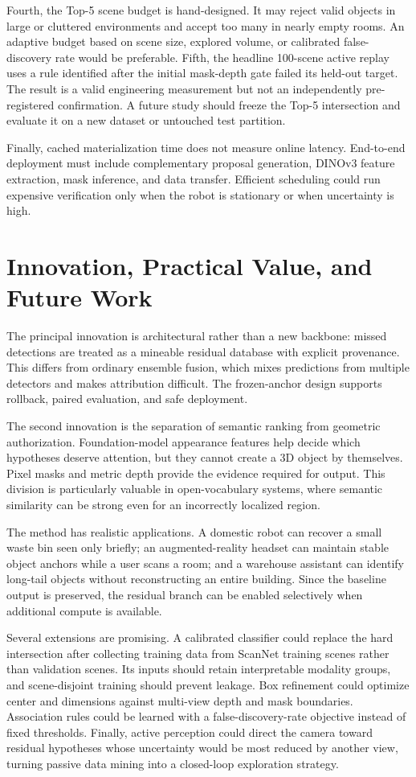 \documentclass[11pt,a4paper]{article}
\begin{document}
Fourth, the Top-5 scene budget is hand-designed. It may reject valid objects in large or cluttered environments and accept too many in nearly empty rooms. An adaptive budget based on scene size, explored volume, or calibrated false-discovery rate would be preferable. Fifth, the headline 100-scene active replay uses a rule identified after the initial mask-depth gate failed its held-out target. The result is a valid engineering measurement but not an independently pre-registered confirmation. A future study should freeze the Top-5 intersection and evaluate it on a new dataset or untouched test partition.

Finally, cached materialization time does not measure online latency. End-to-end deployment must include complementary proposal generation, DINOv3 feature extraction, mask inference, and data transfer. Efficient scheduling could run expensive verification only when the robot is stationary or when uncertainty is high.

\section{Innovation, Practical Value, and Future Work}
The principal innovation is architectural rather than a new backbone: missed detections are treated as a mineable residual database with explicit provenance. This differs from ordinary ensemble fusion, which mixes predictions from multiple detectors and makes attribution difficult. The frozen-anchor design supports rollback, paired evaluation, and safe deployment.

The second innovation is the separation of semantic ranking from geometric authorization. Foundation-model appearance features help decide which hypotheses deserve attention, but they cannot create a 3D object by themselves. Pixel masks and metric depth provide the evidence required for output. This division is particularly valuable in open-vocabulary systems, where semantic similarity can be strong even for an incorrectly localized region.

The method has realistic applications. A domestic robot can recover a small waste bin seen only briefly; an augmented-reality headset can maintain stable object anchors while a user scans a room; and a warehouse assistant can identify long-tail objects without reconstructing an entire building. Since the baseline output is preserved, the residual branch can be enabled selectively when additional compute is available.

Several extensions are promising. A calibrated classifier could replace the hard intersection after collecting training data from ScanNet training scenes rather than validation scenes. Its inputs should retain interpretable modality groups, and scene-disjoint training should prevent leakage. Box refinement could optimize center and dimensions against multi-view depth and mask boundaries. Association rules could be learned with a false-discovery-rate objective instead of fixed thresholds. Finally, active perception could direct the camera toward residual hypotheses whose uncertainty would be most reduced by another view, turning passive data mining into a closed-loop exploration strategy.
\end{document}
